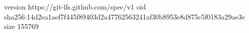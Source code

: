 version https://git-lfs.github.com/spec/v1
oid sha256:14d2ea1aef7f445f89403d2a47762563241af30b8953e8d875c5f0183a29ae3e
size 155769
